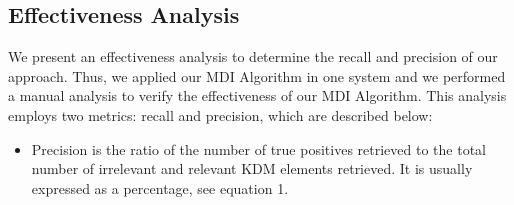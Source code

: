 \subsection{Effectiveness Analysis}\label{hypothesis_formulation}	

We present an effectiveness analysis to determine the recall and precision of our approach. Thus, we applied our MDI Algorithm in one system and we performed a manual analysis to verify the effectiveness of our MDI Algorithm. This analysis employs two metrics: recall and precision, which are described below:

\begin{itemize}
\item Precision is the ratio of the number of true positives retrieved to the total number of irrelevant and relevant KDM elements retrieved. It is usually expressed as a percentage, see equation 1.
\end{itemize}




